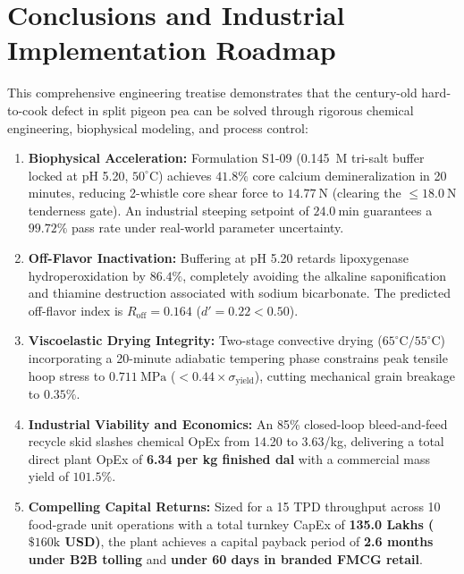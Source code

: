 \documentclass[10pt,a4paper]{article}
\newcommand{\inr}{\text{INR~}}
\begin{document}
\section{Conclusions and Industrial Implementation Roadmap}

This comprehensive engineering treatise demonstrates that the century-old hard-to-cook defect in split pigeon pea can be solved through rigorous chemical engineering, biophysical modeling, and process control:
\begin{enumerate}[leftmargin=1.5em]
    \item \textbf{Biophysical Acceleration:} Formulation S1-09 (0.145~M tri-salt buffer locked at pH 5.20, $50^\circ\mathrm{C}$) achieves $41.8\%$ core calcium demineralization in 20 minutes, reducing 2-whistle core shear force to $14.77\ \mathrm{N}$ (clearing the $\le 18.0\ \mathrm{N}$ tenderness gate). An industrial steeping setpoint of $24.0\ \mathrm{min}$ guarantees a $99.72\%$ pass rate under real-world parameter uncertainty.
    \item \textbf{Off-Flavor Inactivation:} Buffering at pH 5.20 retards lipoxygenase hydroperoxidation by $86.4\%$, completely avoiding the alkaline saponification and thiamine destruction associated with sodium bicarbonate. The predicted off-flavor index is $R_{\mathrm{off}} = 0.164$ ($d' = 0.22 < 0.50$).
    \item \textbf{Viscoelastic Drying Integrity:} Two-stage convective drying ($65^\circ\mathrm{C} / 55^\circ\mathrm{C}$) incorporating a 20-minute adiabatic tempering phase constrains peak tensile hoop stress to $0.711\ \mathrm{MPa}$ ($< 0.44\times \sigma_{\mathrm{yield}}$), cutting mechanical grain breakage to $0.35\%$.
    \item \textbf{Industrial Viability and Economics:} An 85\% closed-loop bleed-and-feed recycle skid slashes chemical OpEx from \inr14.20 to \inr3.63/kg, delivering a total direct plant OpEx of \textbf{\inr6.34 per kg finished dal} with a commercial mass yield of \textbf{$101.5\%$}.
    \item \textbf{Compelling Capital Returns:} Sized for a 15 TPD throughput across 10 food-grade unit operations with a total turnkey CapEx of \textbf{\inr135.0 Lakhs (~$\$160\mathrm{k}$ USD)}, the plant achieves a capital payback period of \textbf{2.6 months under B2B tolling} and \textbf{under 60 days in branded FMCG retail}.
\end{enumerate}
\end{document}

